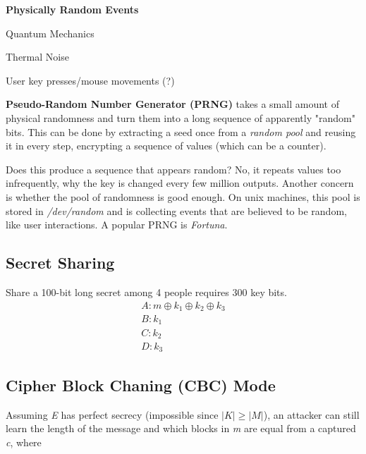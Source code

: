 \documentclass[12pt]{article}
\begin{document}
\textbf{Physically Random Events}\begin{list}{*}{
\setlength{\itemsep}{0pt}
\setlength{\parsep}{0pt}
\setlength{\topsep}{0pt}
\setlength{\partopsep}{0pt}
\setlength{\leftmargin}{2em}
\setlength{\labelwidth}{1.5em}
\setlength{\labelsep}{0.5em}
}
\item Quantum Mechanics
\item Thermal Noise
\item User key presses/mouse movements (?)
\end{list}

\textbf{Pseudo-Random Number Generator (PRNG)} takes a small amount of physical randomness and turn them into a long sequence of apparently "random" bits. This can be done by extracting a seed once from a \emph{random pool} and reusing it in every step, encrypting a sequence of values (which can be a counter).

Does this produce a sequence that appears random? No, it repeats values too infrequently, why the key is changed every few million outputs. Another concern is whether the pool of randomness is good enough. On unix machines, this pool is stored in \emph{/dev/random} and is collecting events that are believed to be random, like user interactions. A popular PRNG is \emph{Fortuna}.

\subsection{Secret Sharing}

Share a 100-bit long secret among 4 people requires 300 key bits.
\begin{equation}
\begin{split}
A: m \oplus k_1 \oplus k_2 \oplus k_3 \\
B: k_1 \\
C: k_2 \\
D: k_3
\end{split}
\end{equation}
 
\subsection{Cipher Block Chaning (CBC) Mode}

Assuming \emph{E} has perfect secrecy (impossible since $|K| \ge |M|$), an attacker can still learn the length of the message and which blocks in \emph{m} are equal from a captured \emph{c}, where
\end{document}
